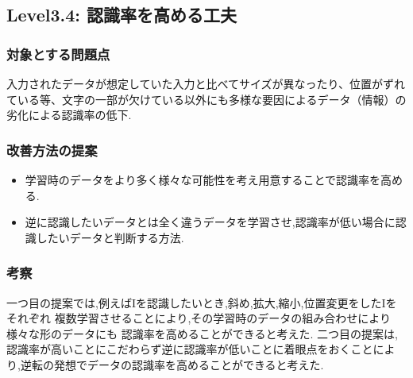 \subsection{Level3.4: 認識率を高める工夫}
\subsubsection{対象とする問題点}
入力されたデータが想定していた入力と比べてサイズが異なったり、位置がずれている等、文字の一部が欠けている以外にも多様な要因によるデータ（情報）の劣化による認識率の低下.
\subsubsection{改善方法の提案}
	\begin{itemize}
	\item 学習時のデータをより多く様々な可能性を考え用意することで認識率を高める.
	\item 逆に認識したいデータとは全く違うデータを学習させ,認識率が低い場合に認識したいデータと判断する方法.
	\end{itemize}
\subsubsection{考察}
一つ目の提案では,例えばIを認識したいとき,斜め,拡大,縮小,位置変更をしたIをそれぞれ
複数学習させることにより,その学習時のデータの組み合わせにより様々な形のデータにも
認識率を高めることができると考えた.
二つ目の提案は,認識率が高いことにこだわらず逆に認識率が低いことに着眼点をおくことにより,逆転の発想でデータの認識率を高めることができると考えた.
